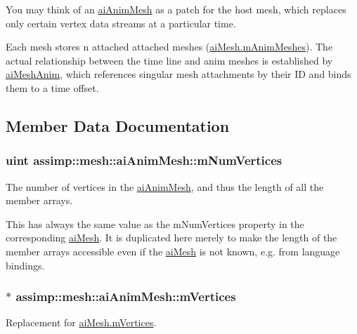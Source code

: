 You may think of an {\ttfamily \hyperlink{structassimp_1_1mesh_1_1ai_anim_mesh}{ai\+Anim\+Mesh}} as a {\ttfamily patch} for the host mesh, which replaces only certain vertex data streams at a particular time.

Each mesh stores n attached attached meshes ({\ttfamily \hyperlink{structassimp_1_1mesh_1_1ai_mesh_a0ef0cdda627aca52178b73ec25d58a82}{ai\+Mesh.\+m\+Anim\+Meshes}}). The actual relationship between the time line and anim meshes is established by \hyperlink{structai_mesh_anim}{ai\+Mesh\+Anim}, which references singular mesh attachments by their I\+D and binds them to a time offset. 

\subsection{Member Data Documentation}
\hypertarget{structassimp_1_1mesh_1_1ai_anim_mesh_a27ffb0b815ed3f6936fa42b54217dfe7}{
\subsubsection[{m\+Num\+Vertices}]{\setlength{\rightskip}{0pt plus 5cm}uint assimp\+::mesh\+::ai\+Anim\+Mesh\+::m\+Num\+Vertices}}\label{structassimp_1_1mesh_1_1ai_anim_mesh_a27ffb0b815ed3f6936fa42b54217dfe7}
The number of vertices in the \hyperlink{structassimp_1_1mesh_1_1ai_anim_mesh}{ai\+Anim\+Mesh}, and thus the length of all the member arrays.

This has always the same value as the m\+Num\+Vertices property in the corresponding \hyperlink{structassimp_1_1mesh_1_1ai_mesh}{ai\+Mesh}. It is duplicated here merely to make the length of the member arrays accessible even if the \hyperlink{structassimp_1_1mesh_1_1ai_mesh}{ai\+Mesh} is not known, e.\+g. from language bindings. \hypertarget{structassimp_1_1mesh_1_1ai_anim_mesh_a3ba759b7b90d26017907f6c80557dcbf}{
\subsubsection[{m\+Vertices}]{$\ast$ assimp\+::mesh\+::ai\+Anim\+Mesh\+::m\+Vertices}}\label{structassimp_1_1mesh_1_1ai_anim_mesh_a3ba759b7b90d26017907f6c80557dcbf}
Replacement for \hyperlink{structassimp_1_1mesh_1_1ai_mesh_ae32bf7a3f9169463de97bd33622f8272}{ai\+Mesh.\+m\+Vertices}.

